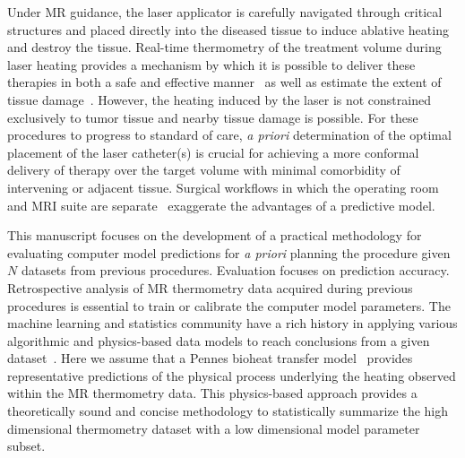\documentclass[12pt]{article}
\begin{document}
Under MR guidance, the laser applicator is carefully navigated through
critical structures and placed directly into the diseased tissue to induce
ablative heating and destroy the tissue. 
Real-time thermometry of the treatment volume during
laser heating provides a mechanism by which it is possible to deliver
these therapies in both a safe and effective 
manner~\cite{rieke2008mr, denis2005magnetic,stafford2010magnetic,
woodrum2010feasibility} as well as estimate the extent of tissue
damage~\cite{hyperthermia2003basic,mcdannold2006uterine,mcnichols2004technical}. 
However, the heating induced by the laser is not constrained exclusively
to tumor tissue and nearby tissue damage is possible. 
For these procedures to progress to standard of care, 
\textit{a priori} determination of the optimal placement of the laser catheter(s) is crucial
for achieving a more conformal delivery of therapy over the target volume
with minimal comorbidity of intervening or adjacent tissue.
{\color{red}Surgical workflows in which the operating room and MRI suite are separate~\cite{Curry2012,Tovar-Spinoza2013}
exaggerate the advantages of a predictive model.}

This manuscript focuses on the development of a practical methodology for
evaluating computer model predictions for \textit{a priori} planning the procedure  
given $N$ datasets from previous procedures.
{\color{red} Evaluation focuses on prediction accuracy.}
Retrospective analysis of MR thermometry data acquired during previous procedures is
essential to train or calibrate the computer model parameters. 
The machine learning and statistics community have a rich history in
applying various algorithmic and physics-based data models to reach conclusions from a
given dataset~\cite{Breiman2001,Hastie2005}. 
Here we assume that a Pennes bioheat transfer model~\cite{Pennes1948} provides
representative predictions of the  physical process underlying the heating
observed within the MR thermometry data.
This physics-based approach
provides a theoretically sound and concise methodology to statistically summarize the high
dimensional thermometry dataset with a low dimensional model parameter subset. 
\end{document}
